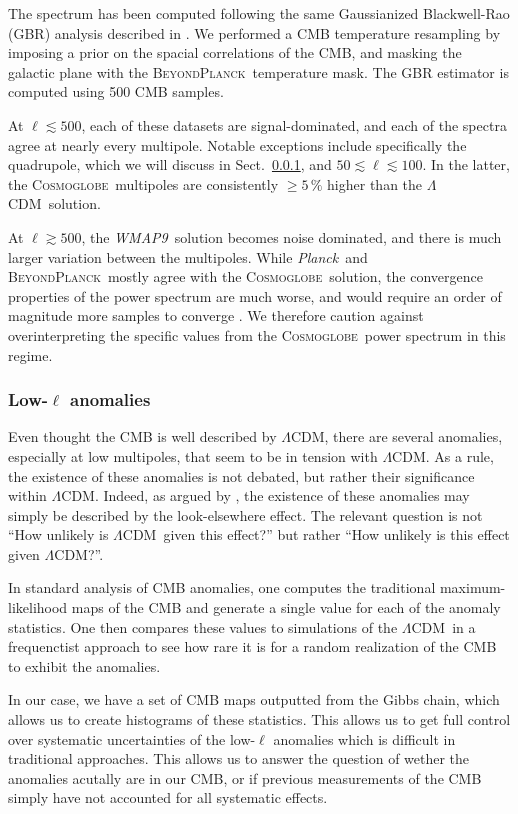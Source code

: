 \documentclass[twocolumn]{../../common/aa}
\def\WMAPnine{\emph{WMAP9}}
\def\planck{\emph{Planck}}
\def\LCDM{$\Lambda$CDM}
\newcommand{\bp}{\textsc{BeyondPlanck}}
\newcommand{\cosmoglobe}{\textsc{Cosmoglobe}}
\begin{document}
The spectrum has been computed following the same Gaussianized Blackwell-Rao (GBR) \citep{rudjord:2009} analysis described in \citep{bp11}. We performed a CMB temperature resampling by imposing a prior on the spacial correlations of the CMB, and masking the galactic plane with the \bp\ temperature mask. The GBR estimator is computed using 500 CMB samples.

At $\ell\lesssim500$, each of these datasets are signal-dominated, and each of the spectra agree at nearly every multipole. Notable exceptions include specifically the quadrupole, which we will discuss in Sect.~\ref{sec:anomalies}, and $50\lesssim\ell\lesssim100$. In the latter, the \cosmoglobe\ multipoles are consistently $\geq5\,\%$ higher than the \LCDM\ solution.

At $\ell\gtrsim500$, the \WMAPnine\ solution becomes noise dominated, and there is much larger variation between the multipoles. While \planck\ and \bp\ mostly agree with the \cosmoglobe\ solution, the convergence properties of the power spectrum are much worse, and would require an order of magnitude more samples to converge \citep{bp11}. We therefore caution against overinterpreting the specific values from the \cosmoglobe\ power spectrum in this regime.


\subsubsection{Low-$\ell$ anomalies}
\label{sec:anomalies}

Even thought the CMB is well described by \LCDM, there are several anomalies, especially at low multipoles, that seem to be in tension with \LCDM. As a rule, the existence of these anomalies is not debated, but rather their significance within \LCDM. Indeed, as argued by \citet{bennett2010}, the existence of these anomalies may simply be described by the look-elsewhere effect. The relevant question is not ``How unlikely is \LCDM\ given this effect?'' but rather ``How unlikely is this effect given \LCDM?''.

In standard analysis of CMB anomalies, one computes the traditional maximum-likelihood maps of the CMB and generate a single value for each of the anomaly statistics. One then compares these values to simulations of the \LCDM\ in a frequenctist approach to see how rare it is for a random realization of the CMB to exhibit the anomalies.

In our case, we have a set of CMB maps outputted from the Gibbs chain, which allows us to create histograms of these statistics. This allows us to get full control over systematic uncertainties of the low-$\ell$ anomalies which is difficult in traditional approaches. This allows us to answer the question of wether the anomalies acutally are in our CMB, or if previous measurements of the CMB simply have not accounted for all systematic effects.
\end{document}

